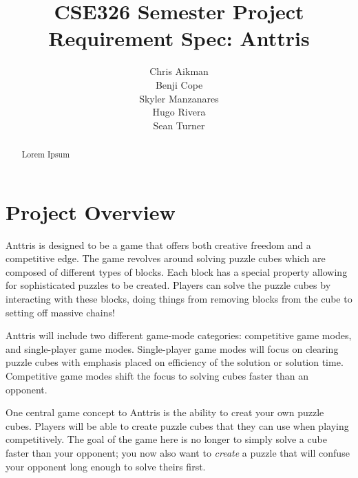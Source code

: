 \documentclass[12pt]{article}
\begin{document}
\title{CSE326 Semester Project Requirement Spec: Anttris}
\author{Chris Aikman\\Benji Cope\\Skyler Manzanares\\Hugo Rivera\\Sean Turner}
\maketitle
\begin{abstract}
Lorem Ipsum
\end{abstract}
\section{Project Overview}\label{overview-SM}
Anttris is designed to be a game that offers both creative freedom and a competitive edge. The game revolves around solving puzzle cubes which are composed of different types of blocks. Each block has a special property allowing for sophisticated puzzles to be created. Players can solve the puzzle cubes by interacting with these blocks, doing things from removing blocks from the cube to setting off massive chains!

Anttris will include two different game-mode categories: competitive game modes, and single-player game modes. Single-player game modes will focus on clearing puzzle cubes with emphasis placed on efficiency of the solution or solution time. Competitive game modes shift the focus to solving cubes faster than an opponent.

One central game concept to Anttris is the ability to creat your own puzzle cubes. Players will be able to create puzzle cubes that they can use when playing competitively. The goal of the game here is no longer to simply solve a cube faster than your opponent; you now also want to \textsl{create} a puzzle that will confuse your opponent long enough to solve theirs first.
\end{document}
